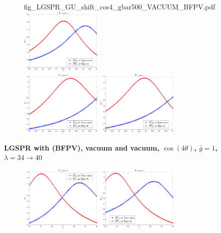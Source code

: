 \documentclass[11pt]{article}
\begin{document}
\begin{figure}[H]
{		{fig_LGSPR_GU_shift_cos4_gbar500_VACUUM_BFPV.pdf}}
	\quad
	\subfigure 
	{\includegraphics[width=0.35\textwidth]
		{fig_LGSPR_GW_shift_cos4_gbar500_VACUUM_BFPV.pdf}}
	\\
	\subfigure 
	{\includegraphics[width=0.35\textwidth]
		{fig_LGSPR_GU_shift_cos4_gbar1000_VACUUM_BFPV.pdf}}
	\quad
	\subfigure 
	{\includegraphics[width=0.35\textwidth]
		{fig_LGSPR_GW_shift_cos4_gbar1000_VACUUM_BFPV.pdf}}
\end{figure}

\noindent\textbf{\large LGSPR  with (BFPV), vacuum and vacuum, $\cos(4\theta)$, $\bar{g} = 1$, $\lambda=34 \to 40$}
\begin{figure}[H]
	\centering
	\subfigure 
	{\includegraphics[width=0.35\textwidth]
		{fig_LGSPR_GU_shift_cos4_gbar1000_VACUUM_BFPV_1.pdf}}
	\quad
	\subfigure 
	{\includegraphics[width=0.35\textwidth]
		{fig_LGSPR_GW_shift_cos4_gbar1000_VACUUM_BFPV_1.pdf}}
\end{figure}
\end{document}
